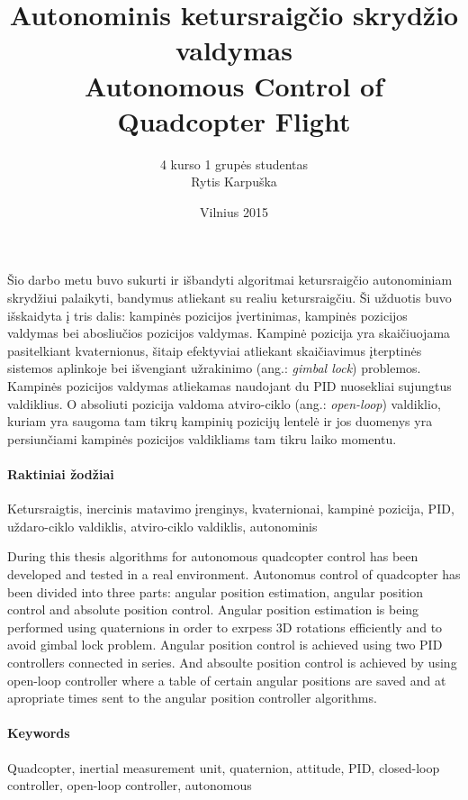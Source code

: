 \documentclass[12pt, a4paper, lithuanian, final]{article}
\title{Autonominis ketursraigčio skrydžio valdymas\\Autonomous Control of Quadcopter Flight}
\author{
    4 kurso 1 grupės studentas \\
    Rytis Karpuška
}
\date{Vilnius 2015}
\begin{document}
\maketitle

Šio darbo metu buvo sukurti ir išbandyti algoritmai ketursraigčio autonominiam skrydžiui palaikyti, bandymus atliekant su realiu ketursraigčiu.
Ši užduotis buvo išskaidyta į tris dalis: kampinės pozicijos įvertinimas, kampinės pozicijos valdymas bei abosliučios pozicijos valdymas.
Kampinė pozicija yra skaičiuojama pasitelkiant kvaternionus, šitaip efektyviai atliekant skaičiavimus įterptinės sistemos aplinkoje bei išvengiant užrakinimo (ang.: \textit{gimbal lock}) problemos.
Kampinės pozicijos valdymas atliekamas naudojant du PID nuosekliai sujungtus valdiklius.
O absoliuti pozicija valdoma atviro-ciklo (ang.: \textit{open-loop}) valdiklio, kuriam yra saugoma tam tikrų kampinių pozicijų lentelė ir jos duomenys yra persiunčiami kampinės pozicijos valdikliams tam tikru laiko momentu.

\paragraph{Raktiniai žodžiai} Ketursraigtis, inercinis matavimo įrenginys, kvaternionai, kampinė pozicija, PID, uždaro-ciklo valdiklis, atviro-ciklo valdiklis, autonominis



During this thesis algorithms for autonomous quadcopter control has been developed and tested in a real environment.
Autonomus control of quadcopter has been divided into three parts: angular position estimation, angular position control and absolute position control.
Angular position estimation is being performed using quaternions in order to exrpess 3D rotations efficiently and to avoid gimbal lock problem.
Angular position control is achieved using two PID controllers connected in series.
And absoulte position control is achieved by using open-loop controller where a table of certain angular positions are saved and at apropriate times sent to the angular position controller algorithms.

\paragraph{Keywords} Quadcopter, inertial measurement unit, quaternion, attitude, PID, closed-loop controller, open-loop controller, autonomous
\end{document}
